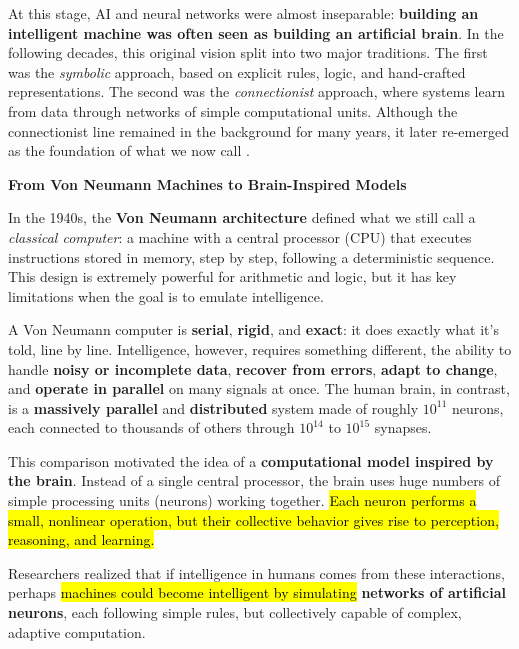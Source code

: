 \highspace
At this stage, AI and neural networks were almost inseparable: \textbf{building an intelligent machine was often seen as building an artificial brain}. In the following decades, this original vision split into two major traditions. The first was the \emph{symbolic} approach, based on explicit rules, logic, and hand-crafted representations. The second was the \emph{connectionist} approach, where systems learn from data through networks of simple computational units. Although the connectionist line remained in the background for many years, it later re-emerged as the foundation of what we now call .

\highspace
\begin{flushleft}
    \textcolor{Green3}{ \textbf{From Von Neumann Machines to Brain-Inspired Models}}
\end{flushleft}
In the 1940s, the \textbf{Von Neumann architecture} defined what we still call a \emph{classical computer}: a machine with a central processor (CPU) that executes instructions stored in memory, step by step, following a deterministic sequence. This design is extremely powerful for arithmetic and logic, but it has key limitations when the goal is to emulate intelligence.

\highspace
A Von Neumann computer is \textbf{serial}, \textbf{rigid}, and \textbf{exact}: it does exactly what it's told, line by line. Intelligence, however, requires something different, the ability to handle \textbf{noisy or incomplete data}, \textbf{recover from errors}, \textbf{adapt to change}, and \textbf{operate in parallel} on many signals at once. The human brain, in contrast, is a \textbf{massively parallel} and \textbf{distributed} system made of roughly $10^{11}$ neurons, each connected to thousands of others through $10^{14}$ to $10^{15}$ synapses.

\highspace
This comparison motivated the idea of a \textbf{computational model inspired by the brain}. Instead of a single central processor, the brain uses huge numbers of simple processing units (neurons) working together. \hl{Each neuron performs a small, nonlinear operation, but their collective behavior gives rise to perception, reasoning, and learning.}

\highspace
Researchers realized that if intelligence in humans comes from these interactions, perhaps \hl{machines could become intelligent by simulating} \textbf{networks of artificial neurons}, each following simple rules, but collectively capable of complex, adaptive computation.

